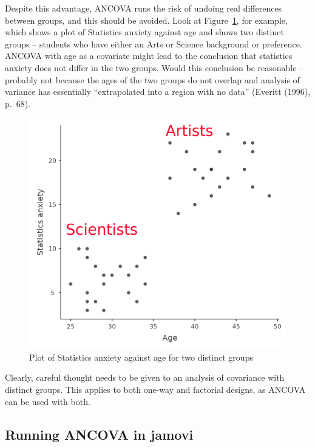 \documentclass[
  a4paper,
]{book}
\begin{document}
Despite this advantage, ANCOVA runs the risk of undoing real differences
between groups, and this should be avoided. Look at
Figure~\ref{fig-fig14-11}, for example, which shows a plot of Statistics
anxiety against age and shows two distinct groups -- students who have
either an Arts or Science background or preference. ANCOVA with age as a
covariate might lead to the conclusion that statistics anxiety does not
differ in the two groups. Would this conclusion be reasonable --
probably not because the ages of the two groups do not overlap and
analysis of variance has essentially ``extrapolated into a region with
no data'' (Everitt (1996), p.~68).

\begin{figure}

\includegraphics[width=1\textwidth,height=\textheight]{images/fig14-11.png} \hfill{}

\caption{\label{fig-fig14-11}Plot of Statistics anxiety against age for
two distinct groups}

\end{figure}

Clearly, careful thought needs to be given to an analysis of covariance
with distinct groups. This applies to both one-way and factorial
designs, as ANCOVA can be used with both.

\hypertarget{running-ancova-in-jamovi}{%
\subsection{Running ANCOVA in jamovi}\label{running-ancova-in-jamovi}}
\end{document}
